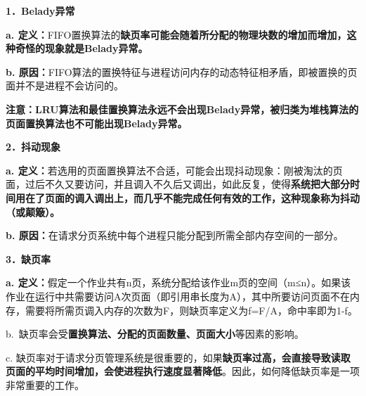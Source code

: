 \textbf{{1．Belady异常}}

\textbf{a.
定义：}{FIFO置换算法的}\textbf{缺页率可能会随着所分配的物理块数的增加而增加，这种奇怪的现象就是Belady异常。}

\textbf{b.
原因：}FIFO算法的置换特征与进程访问内存的动态特征相矛盾，即被置换的页面并不是进程不会访问的。

\textbf{{注意：LRU算法和最佳置换算法永远不会出现Belady异常，被归类为堆栈算法的页面置换算法也不可能出现Belady异常。}}

\textbf{{2．抖动现象}}

\textbf{a.
定义：}{若选用的页面置换算法不合适，可能会出现抖动现象：刚被淘汰的页面，过后不久又要访问，并且调入不久后又调出，如此反复，使得}\textbf{系统把大部分时间用在了页面的调入调出上，而几乎不能完成任何有效的工作，这种现象称为抖动（或颠簸）。}

\textbf{b.
原因：}在请求分页系统中每个进程只能分配到所需全部内存空间的一部分。

\textbf{{3．缺页率}}

\textbf{a.
定义：}{假定一个作业共有n页，系统分配给该作业m页的空间（m≤n）。如果该作业在运行中共需要访问A次页面（即引用串长度为A），其中所要访问页面不在内存，需要将所需页调入内存的次数为F，则缺页率定义为f=F/A，命中率即为1-f。}

b.~缺页率会受\textbf{置换算法、分配的页面数量、页面大小}等因素的影响。

c.
缺页率对于请求分页管理系统是很重要的，如果\textbf{缺页率过高，会直接导致读取页面的平均时间增加，会使进程执行速度显著降低}。因此，如何降低缺页率是一项非常重要的工作。
